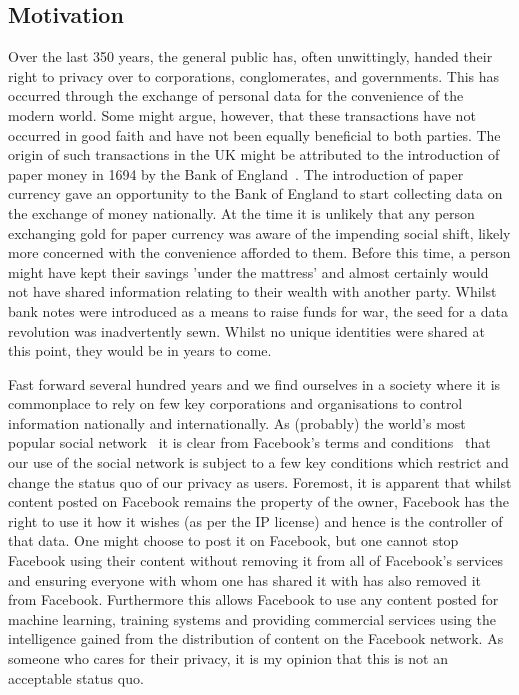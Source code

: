 \subsection{Motivation}

Over the last 350 years, the general public has, often unwittingly, handed their right to privacy over to corporations, conglomerates, and governments. This has occurred through the exchange of personal data for the convenience of the modern world. Some might argue, however, that these transactions have not occurred in good faith and have not been equally beneficial to both parties.
\newline
The origin of such transactions in the UK might be attributed to the introduction of paper money in 1694 by the Bank of England~\cite{bankofengland:2016:online}. The introduction of paper currency gave an opportunity to the Bank of England to start collecting data on the exchange of money nationally. At the time it is unlikely that any person exchanging gold for paper currency was aware of the impending social shift, likely more concerned with the convenience afforded to them. Before this time, a person might have kept their savings 'under the mattress' and almost certainly would not have shared information relating to their wealth with another party. Whilst bank notes were introduced as a means to raise funds for war, the seed for a data revolution was inadvertently sewn. Whilst no unique identities were shared at this point, they would be in years to come.

Fast forward several hundred years and we find ourselves in a society where it is commonplace to rely on few key corporations and organisations to control information nationally and internationally. As (probably) the world's most popular social network~\cite{worldmapsocialnetworks:2017:online} it is clear from Facebook's terms and conditions~\cite{facebookterms:2015:online} that our use of the social network is subject to a few key conditions which restrict and change the status quo of our privacy as users. Foremost, it is apparent that whilst content posted on Facebook remains the property of the owner, Facebook has the right to use it how it wishes (as per the IP license) and hence is the controller of that data. One might choose to post it on Facebook, but one cannot stop Facebook using their content without removing it from all of Facebook's services and ensuring everyone with whom one has shared it with has also removed it from Facebook. Furthermore this allows Facebook to use any content posted for machine learning, training systems and providing commercial services using the intelligence gained from the distribution of content on the Facebook network. As someone who cares for their privacy, it is my opinion that this is not an acceptable status quo.

